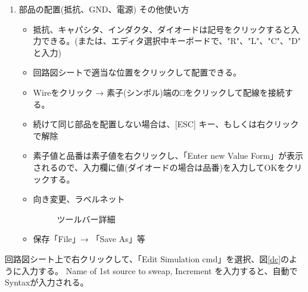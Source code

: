 \begin{enumerate}
  \item 部品の配置(抵抗、GND、電源) その他使い方
  \begin{itemize}
    \setlength{\parskip}{0cm} %
    \setlength{\itemsep}{0cm} %
    \item 抵抗、キャパシタ、インダクタ、ダイオードは記号をクリックすると入力できる。(または、エディタ選択中キーボードで、"R"、"L"、"C"、"D" と入力)
    \item 回路図シートで適当な位置をクリックして配置できる。
    \item Wireをクリック → 素子(シンボル)端の□をクリックして配線を接続する。
    \item 続けて同じ部品を配置しない場合は、[ESC] キー、もしくは右クリックで解除
    \item 素子値と品番は素子値を右クリックし、「Enter new Value Form」が表示されるので、入力欄に値(ダイオードの場合は品番)を入力してOKをクリックする。
    \item 向き変更、ラベルネット
    \begin{figure}[htb]
      \begin{center}
      \caption{ツールバー詳細}
      \end{center}
    \end{figure}
    \item 保存「File」→ 「Save As」等
  \end{itemize}
\end{enumerate}
回路図シート上で右クリックして、「Edit Simulation cmd」を選択、図\ref{dc}のように入力する。
Name of 1st source to sweap, Increment を入力すると、自動でSyntaxが入力される。
